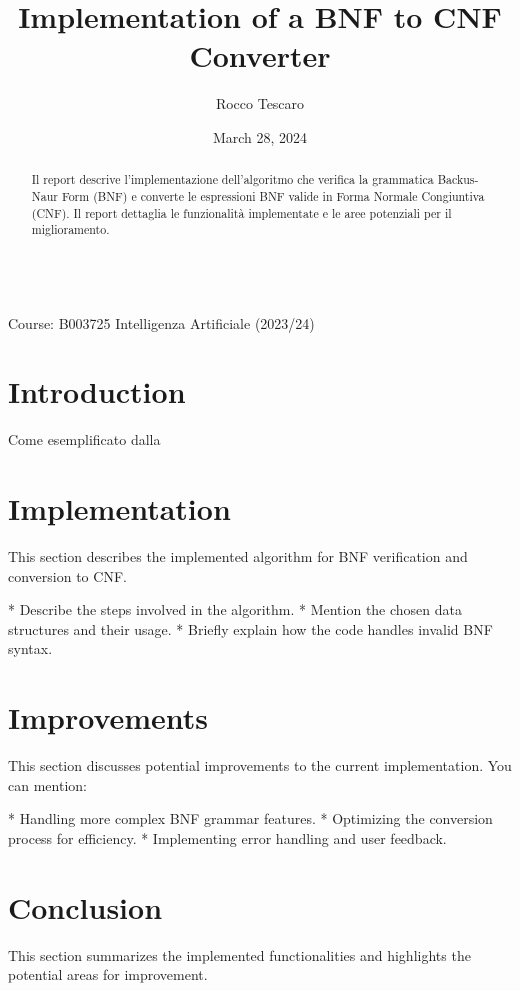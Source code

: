\documentclass{article} %
\begin{document}
\newcommand{\courseinfo}[1]{\\Course: #1}  

\title{Implementation of a BNF to CNF Converter}
\author{Rocco Tescaro} 
\date{March 28, 2024} 
\maketitle  

\courseinfo{B003725 Intelligenza Artificiale (2023/24)} 

\begin{abstract}
Il report descrive l'implementazione dell'algoritmo che verifica la grammatica Backus-Naur Form (BNF) e converte le espressioni BNF valide in Forma Normale Congiuntiva (CNF). Il report dettaglia le funzionalità implementate e le aree potenziali per il miglioramento.
\end{abstract}

\section{Introduction} 

Come esemplificato dalla 

\section{Implementation}  

This section describes the implemented algorithm for BNF verification and conversion to CNF. 

* Describe the steps involved in the algorithm. 
* Mention the chosen data structures and their usage.
* Briefly explain how the code handles invalid BNF syntax.

\section{Improvements} 

This section discusses potential improvements to the current implementation. You can mention:

* Handling more complex BNF grammar features. 
* Optimizing the conversion process for efficiency.
* Implementing error handling and user feedback.

\section{Conclusion}  

This section summarizes the implemented functionalities and highlights the potential areas for improvement.
\end{document}
